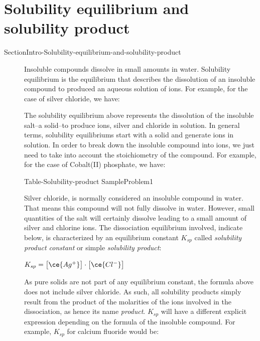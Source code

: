 \documentclass[main.tex]{subfiles}
\begin{document}
\section{Solubility equilibrium and solubility product} {SectionIntro-Solubility-equilibrium-and-solubility-product}
\sloppy
\begin{description}
\item[] Insoluble compounds dissolve in small amounts in water. Solubility equilibrium is the equilibrium that describes the dissolution of an insoluble compound to produced an aqueous solution of ions. For example, for the case of silver chloride, we have:
\begin{center}	 \end{center}
The solubility equilibrium above represents the dissolution of the insoluble salt--a solid--to produce ions, silver and chloride in solution. In general terms, solubility equilibriums start with a solid and generate ions in solution. In order to break down the insoluble compound into ions, we just need to take into account the stoichiometry of the compound. For example, for the case of Cobalt(II) phosphate, we have:
\begin{center}	 \end{center}   
{Table-Solubility-product}
{SampleProblem1}
\item[] Silver chloride,  is normally considered an insoluble compound in water. That means this compound will not fully dissolve in water. However, small quantities of the salt will certainly dissolve leading to a small amount of silver and chlorine ions. The dissociation equilibrium involved, indicate below, is characterized by an equilibrium constant $K_{sp}$ called \emph{solubility product constant} or simple \emph{solubility product}:
\begin{center}\hfill $K_{sp}= \big[ \ce{Ag^+} \big]\cdot \big[ \ce{Cl^-} \big]$\end{center}
As pure solids are not part of any equilibrium constant, the formula above does not include silver chloride. As such, all solubility products simply result from the product of the molarities of the ions involved in the dissociation, as hence its name \emph{product}. $K_{sp}$ will have a different explicit expression depending on the formula of the insoluble compound. For example, $K_{sp}$ for calcium fluoride would be:

\end{description}
\end{document}
